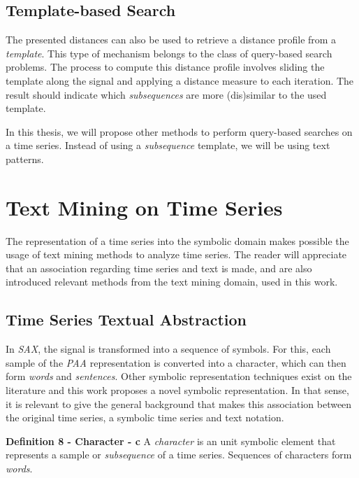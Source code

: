 \subsection{Template-based Search}
\label{sec:query_based_search}

The presented distances can also be used to retrieve a distance profile from a \textit{template}. This type of mechanism belongs to the class of query-based search problems. The process to compute this distance profile involves sliding the template along the signal and applying a distance measure to each iteration. The result should indicate which \textit{subsequences} are more (dis)similar to the used template.
\par


In this thesis, we will propose other methods to perform query-based searches on a time series. Instead of using a \textit{subsequence} template, we will be using text patterns.

\section{Text Mining on Time Series}
\label{sec:text_time}

The representation of a time series into the symbolic domain makes possible the usage of text mining methods to analyze time series. The reader will appreciate that an association regarding time series and text is made, and are also introduced relevant methods from the text mining domain, used in this work.

\subsection{Time Series Textual Abstraction}
\label{subsec:text_abstraction}

In \textit{SAX}, the signal is transformed into a sequence of symbols. For this, each sample of the \textit{PAA} representation is converted into a character, which can then form \textit{words} and \textit{sentences}. Other symbolic representation techniques exist on the literature and this work proposes a novel symbolic representation. In that sense, it is relevant to give the general background that makes this association between the original time series, a symbolic time series and text notation. 

\item \textbf{Definition 8 - Character - c} A \textit{character} is an unit symbolic element that represents a sample or \textit{subsequence} of a time series. Sequences of characters form \textit{words}.


